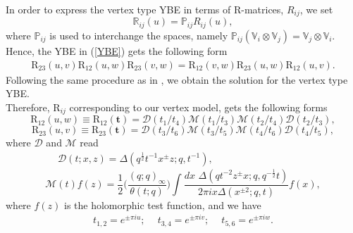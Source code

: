 \documentclass[a4paper,11pt]{article}%
\numberwithin{equation}{section}
\begin{document}
In order to express the vertex type YBE in terms of R-matrices, $R_{ij}$, we set
\begin{equation}
    \mathbb{R}_{ij}(u)= \mathbb{P}_{ij}R_{ij}(u),
\end{equation}
where $\mathbb{P}_{ij}$ is used to interchange the spaces, namely $\mathbb{P}_{ij}(\mathbb{V}_i\otimes\mathbb{V}_j)=\mathbb{V}_j\otimes\mathbb{V}_i$.\\ Hence, the
YBE in (\ref{YBE}) gets the following form
\begin{align}
   \text{R}_{23}(u,v)\text{R}_{12}(u,w)\text{R}_{23}(v,w)=\text{R}_{12}(v,w)\text{R}_{23}(u,w)\text{R}_{12}(u,v).
 \end{align}
 Following the same procedure as in \cite{Derkachov:2012iv,Gahramanov:2015cva}, we obtain the solution for the vertex type YBE.\\
 Therefore, $\text{R}_{ij}$ corresponding to our vertex model, gets the following forms 
 \begin{equation}
    \text{R}_{12}(u,w)\equiv \text{R}_{12}(\textbf{t})=\mathcal{D}(t_1/t_4)\mathcal{M}(t_1/t_3)\mathcal{M}(t_2/t_4)\mathcal{D}(t_2/t_3),
 \end{equation}
  \begin{equation}
     \text{R}_{23}(u,v)\equiv\text{R}_{23}(\textbf{t})=\mathcal{D}(t_3/t_6)\mathcal{M}(t_3/t_5)\mathcal{M}(t_4/t_6)\mathcal{D}(t_4/t_5),
 \end{equation}
 where
 $\mathcal{D}$ and $\mathcal{M}$ read 
  \begin{align}\label{D}
     \mathcal{D}(t;x,z)=\Delta(q^{\frac{1}{2}}t^{-1}x^{\pm}z;q,t^{-1}),\qquad\qquad\qquad\qquad\quad\,\,\,\,
    \end{align}
\begin{equation}\label{M}
    \mathcal{M}(t)f(z) =  \frac{1}{2}\Big(\frac{(q;q)_{\infty}}{\theta(t;q)}\Big) \int \frac{dx\,\,\Delta(qt^{-2}z^{\pm}x;q,q^{-\frac{1}{2}}t)}{2\pi i x\Delta(x^{\pm2};q,t)}f(x),
\end{equation}
where $f(z)$ is the holomorphic test function, and we have
 \begin{align}
     t_{1,2}=e^{\pm\pi iu};\ \quad t_{3,4}=e^{\pm\pi iv};\ \quad t_{5,6}=e^{\pm\pi iw}.
 \end{align}
   
\end{document}
